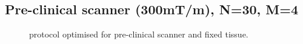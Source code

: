 \begin{subappendices}
{    \subsection{Pre-clinical scanner (300mT/m), N=30, M=4}
    \label{app:chapter7 protocols 300mT}	
    \begin{figure}
    	[H] \centering  \caption{\SF protocol optimised for pre-clinical scanner and fixed tissue.} \label{fig:chapter7 exp1 FREEDIRS_300mT}
    \end{figure}
}
\end{subappendices}
